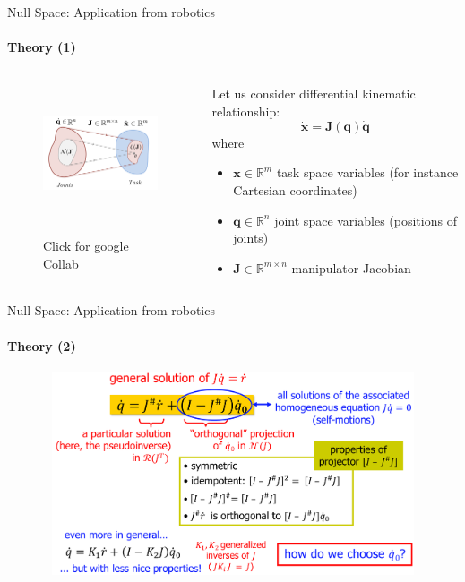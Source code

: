 \documentclass[aspectratio=169]{beamer}
\begin{document}
\begin{frame}[t]{Null Space: Application from robotics}
\framesubtitle{Theory (1)}
\begin{columns}[T,onlytextwidth]
\begin{column}{0.46\textwidth}
\begin{figure}[H]
    \href{https://colab.research.google.com/drive/1VJGLiDYiWY2EeecCETGjEkZpjaqL8v5e?usp=sharing}{\centering\includegraphics[height=4cm,width=1\textwidth,keepaspectratio]{jacobian_mapping.PNG}}
    \caption{Click for google Collab}
    \label{fig:jacobian_mapping.PNG}
\end{figure}
\end{column}
\begin{column}{0.54\textwidth}
    Let us consider differential kinematic relationship:
    \begin{equation}
        \dot{\boldsymbol{x}} = \mathbf{J}(\mathbf{q})\dot{\mathbf{q}}
    \end{equation}
    where
    \begin{itemize}
        \item   $\boldsymbol{x} \in \mathbb{R}^m$ task space variables (for instance Cartesian coordinates)
        \item   $\mathbf{q} \in \mathbb{R}^n$ joint space variables (positions of joints)
        \item   $\mathbf{J} \in \mathbb{R}^{m\times n}$ manipulator Jacobian
    \end{itemize}
\end{column}
\end{columns}
\end{frame}

\begin{frame}[t]{Null Space: Application from robotics}
    \framesubtitle{Theory (2)}
    \vspace{-0.6cm}
    \begin{figure}[H]
        \centering\includegraphics[height=6cm,width=1\textwidth,keepaspectratio]{rob_app_general_idea.png}
        \label{fig:rob_app_general_idea.png}
    \end{figure}
\end{frame}
\end{document}
